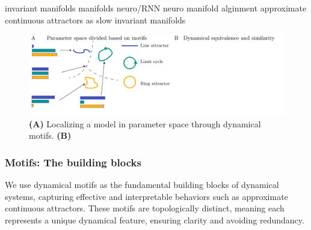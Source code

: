 \documentclass{article}
\theoremstyle{definition} \newtheorem{definition}{Definition}  \newtheorem{example}{Example}
\theoremstyle{remark} \newtheorem{remark}{Remark}
\newcounter{ct}
\begin{document}
invariant manifolds
manifolds neuro/RNN\citep{langdon2023unifying, can2021emergence,cueva2021continuous,gort2024emergence,mishra2021continual,chaudhuri2019attractor, ghazizadeh2021slowmanifold, duncker2021dynamics, pezon2024linking}
neuro \citep{fortunato2024nonlinear}
manifold alginment \citep{kuoch2024probing}
approximate continuous attractors as slow invariant manifolds\citep{Sagodi2024a}

\begin{figure}[htbp]
    \centering
    \includegraphics[width=\linewidth]{motifpspace_dssimilarity}
    \caption{
    \textbf{(A)} Localizing a model in parameter space through dynamical motifs.
     \textbf{(B)} }
    \label{fig:motifpspace_dssimilarity}
\end{figure}


\subsubsection{Motifs: The building blocks}
We use dynamical motifs as the fundamental building blocks of dynamical systems, capturing effective and interpretable behaviors such as approximate continuous attractors.
These motifs are topologically distinct, meaning each represents a unique dynamical feature, ensuring clarity and avoiding redundancy.


\end{document}
